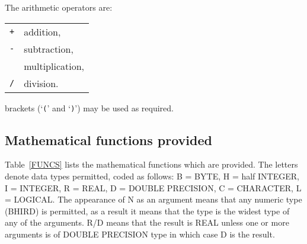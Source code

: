The arithmetic operators are:

\begin{tabular}{ll}
{\tt +}  & addition,        \\
{\tt -}  & subtraction,     \\
{\tt *}  & multiplication,  \\
{\tt /}  & division.        \\
\end{tabular}

brackets (`{\tt (}' and `{\tt )}') may be used as required.


\subsection{Mathematical functions provided}

Table~\ref{FUNCS} lists the mathematical functions which are provided. 
The letters denote data types permitted, coded as follows: B = BYTE, 
H = half INTEGER, I = INTEGER, R = REAL, D = DOUBLE PRECISION, C = 
CHARACTER, L = LOGICAL. The appearance of N as an argument means that 
any numeric type (BHIRD) is permitted, as a result it means that the 
type is the widest type of any of the arguments.  R/D means that the 
result is REAL unless one or more arguments is of DOUBLE PRECISION 
type in which case D is the result. 

